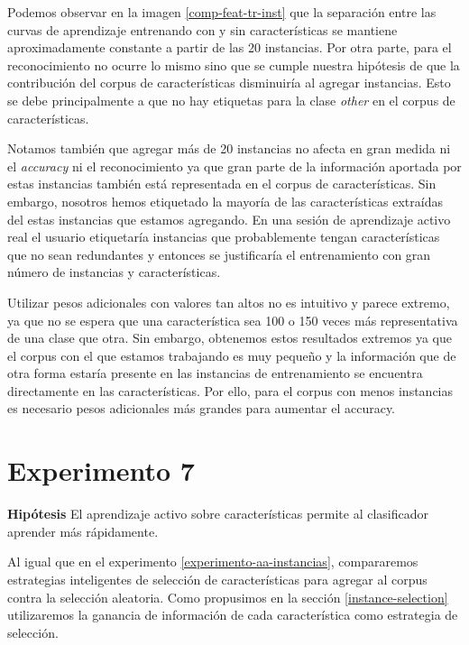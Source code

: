 Podemos observar en la imagen \ref{comp-feat-tr-inst} que la separación entre las curvas de aprendizaje entrenando con y sin características se mantiene aproximadamente constante a partir de las 20 instancias. Por otra parte, para el reconocimiento no ocurre lo mismo sino que se cumple nuestra hipótesis de que la contribución del corpus de características disminuiría al agregar instancias. Esto se debe principalmente a que no hay etiquetas para la clase \textit{other} en el corpus de características.

Notamos también que agregar más de 20 instancias no afecta en gran medida ni el \textit{accuracy} ni el reconocimiento ya que gran parte de la información aportada por estas instancias también está representada en el corpus de características. Sin embargo, nosotros hemos etiquetado la mayoría de las características extraídas del estas instancias que estamos agregando. En una sesión de aprendizaje activo real el usuario etiquetaría instancias que probablemente tengan características que no sean redundantes y entonces se justificaría el entrenamiento con gran número de instancias y características.

Utilizar pesos adicionales con valores tan altos no es intuitivo y parece extremo, ya que no se espera que una característica sea 100 o 150 veces más representativa de una clase que otra. Sin embargo, obtenemos estos resultados extremos ya que el corpus con el que estamos trabajando es muy pequeño y la información que de otra forma estaría presente en las instancias de entrenamiento se encuentra directamente en las características. Por ello, para el corpus con menos instancias es necesario pesos adicionales más grandes para aumentar el accuracy.

\section{Experimento 7}
\vspace{3 mm}
\textbf{Hipótesis} El aprendizaje activo sobre características permite al clasificador aprender más rápidamente.
\vspace{3 mm}

Al igual que en el experimento \ref{experimento-aa-instancias}, compararemos estrategias inteligentes de selección de características para agregar al corpus contra la selección aleatoria. Como propusimos en la sección \ref{instance-selection} utilizaremos la ganancia de información de cada característica como estrategia de selección.

